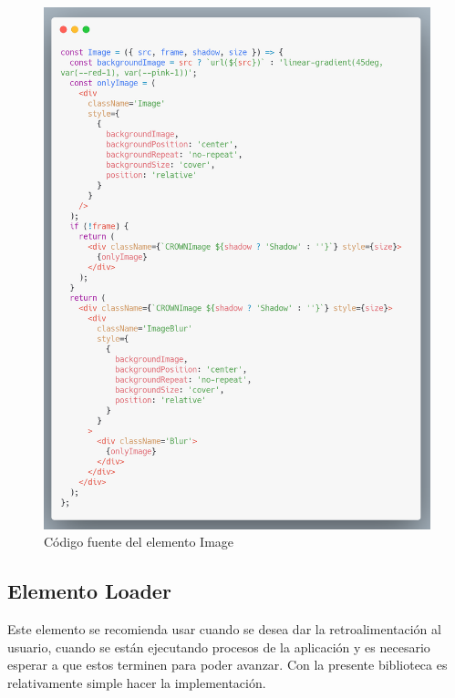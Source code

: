     \begin{figure}[H]
    \centering
    \includegraphics[width=1\textwidth]{./Imagenes/8.35.png}
    \caption[Código fuente del elemento Image]{Código fuente del elemento Image}
    \end{figure}
   \clearpage
   
    
    
    \subsection{Elemento Loader}
Este elemento se recomienda usar cuando se desea dar la retroalimentación al usuario, cuando se están ejecutando procesos de la aplicación y es necesario esperar a que estos terminen para poder avanzar.
Con la presente biblioteca es relativamente simple hacer la implementación.

